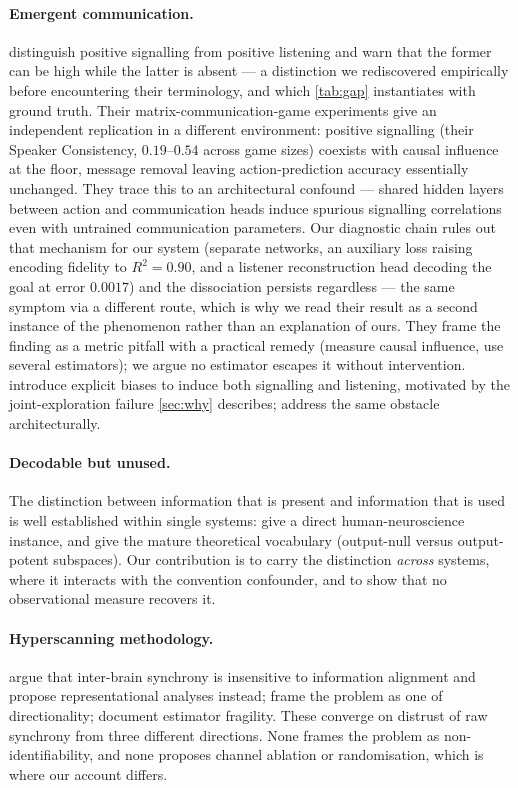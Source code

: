 \documentclass[11pt,a4paper]{article}
\theoremstyle{plain}
\theoremstyle{definition}
\theoremstyle{remark}
\begin{document}
\paragraph{Emergent communication.}
\citet{lowe2019pitfalls} distinguish positive signalling from positive listening and warn that the former can
be high while the latter is absent --- a distinction we rediscovered empirically before encountering their
terminology, and which \cref{tab:gap} instantiates with ground truth. Their matrix-communication-game
experiments give an independent replication in a different environment: positive signalling (their Speaker
Consistency, $0.19$--$0.54$ across game sizes) coexists with causal influence at the floor, message removal
leaving action-prediction accuracy essentially unchanged. They trace this to an architectural confound ---
shared hidden layers between action and communication heads induce spurious signalling correlations even with
untrained communication parameters. Our diagnostic chain rules out that mechanism for our system (separate
networks, an auxiliary loss raising encoding fidelity to $R^2 = 0.90$, and a listener reconstruction head
decoding the goal at error $0.0017$) and the dissociation persists regardless --- the same symptom via a
different route, which is why we read their result as a second instance of the phenomenon rather than an
explanation of ours. They frame the finding as a metric pitfall with a practical remedy (measure causal
influence, use several estimators); we argue no estimator escapes it without intervention.
\citet{eccles2019biases} introduce explicit biases to induce both signalling and listening, motivated by the
joint-exploration failure \cref{sec:why} describes; \citet{foerster2016learning} address the same obstacle
architecturally.

\paragraph{Decodable but unused.}
The distinction between information that is present and information that is used is well established within
single systems: \citet{grootswagers2018finding} give a direct human-neuroscience instance, and
\citet{kaufman2014cortical} give the mature theoretical vocabulary (output-null versus output-potent
subspaces). Our contribution is to carry the distinction \emph{across} systems, where it interacts with the
convention confounder, and to show that no observational measure recovers it.

\paragraph{Hyperscanning methodology.}
\citet{varlet2024measuring} argue that inter-brain synchrony is insensitive to information alignment and
propose representational analyses instead; \citet{markus2024hyperscanning} frame the problem as one of
directionality; \citet{zimmermann2025arbitrary} document estimator fragility. These converge on distrust of
raw synchrony from three different directions. None frames the problem as non-identifiability, and none
proposes channel ablation or randomisation, which is where our account differs.
\end{document}
